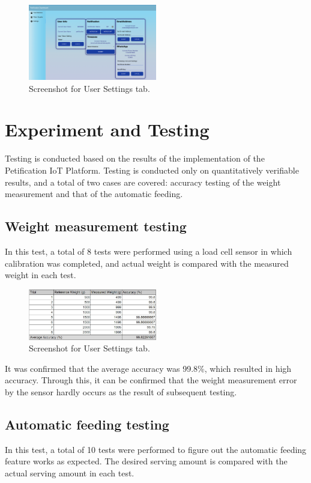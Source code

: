 \documentclass[conference]{IEEEtran}
\begin{document}
\begin{figure}[htbp]
\centerline{\includegraphics[width=0.5\textwidth]{./images/user_settings_ui.png}}
\caption{Screenshot for User Settings tab.}
\label{fig}
\end{figure}

\section{Experiment and Testing}
Testing is conducted based on the results of the implementation of the Petification IoT Platform. Testing is conducted only on quantitatively verifiable results, and a total of two cases are covered: accuracy testing of the weight measurement and that of the automatic feeding.

\subsection{Weight measurement testing}
In this test, a total of 8 tests were performed using a load cell sensor in which calibration was completed, and actual weight is compared with the measured weight in each test.

\begin{figure}[htbp]
\centerline{\includegraphics[width=0.5\textwidth]{./images/Calibration_sheet.jpg}}
\caption{Screenshot for User Settings tab.}
\label{fig}
\end{figure}

It was confirmed that the average accuracy was 99.8\%, which resulted in high accuracy. Through this, it can be confirmed that the weight measurement error by the sensor hardly occurs as the result of subsequent testing.

\subsection{Automatic feeding testing}
In this test, a total of 10 tests were performed to figure out the automatic feeding feature works as expected. The desired serving amount is compared with the actual serving amount in each test.
\end{document}
